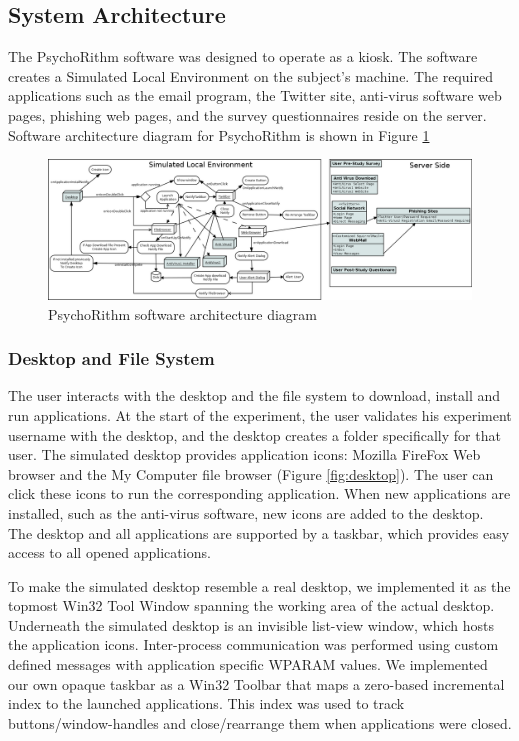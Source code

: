 \subsection{System Architecture}
The PsychoRithm software was designed to operate as a kiosk. The software creates a Simulated Local Environment on the subject's machine. The required applications such as the email program, the Twitter site, anti-virus software web pages, phishing web pages, and the survey questionnaires reside on the server. Software architecture diagram for PsychoRithm is shown in Figure \ref{fig:psyarch}
\begin{figure}[pbt]
  \centering
\includegraphics[width=\columnwidth, keepaspectratio=true]{img/fulluml.png}
  \caption{PsychoRithm software architecture diagram}
  \label{fig:psyarch}
\end{figure}


\subsubsection{Desktop and File System}
The user interacts with the desktop and the file system to download, install and run applications.
At the start of the experiment, the user validates his experiment username with the desktop,
and the desktop creates a folder specifically for that user. The simulated desktop provides application icons: Mozilla FireFox Web browser and the My Computer file browser (Figure \ref{fig:desktop}). The user can click these icons to run the corresponding application. When new applications are installed, such as the anti-virus software, new icons are added to the desktop. The desktop and all applications are supported by a taskbar, which provides easy access to all opened applications.

To make the simulated desktop resemble a real desktop, we implemented it as the topmost Win32 Tool Window spanning the working area of the actual desktop. Underneath the simulated desktop is an invisible list-view window, which hosts the application icons. Inter-process communication was performed using custom defined messages with application specific WPARAM values. We implemented our own opaque taskbar as a Win32 Toolbar that maps a zero-based incremental index to the launched applications. This index was used to track buttons/window-handles and close/rearrange them when applications were closed.

